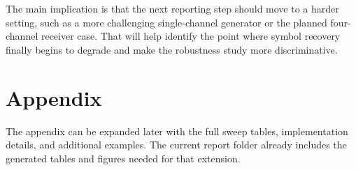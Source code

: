 \documentclass[conference]{IEEEtran}
\begin{document}
The main implication is that the next reporting step should move to a harder setting, such as a more challenging single-channel generator or the planned four-channel receiver case. That will help identify the point where symbol recovery finally begins to degrade and make the robustness study more discriminative.




\appendices
\section{Appendix}
The appendix can be expanded later with the full sweep tables, implementation details, and additional examples. The current report folder already includes the generated tables and figures needed for that extension.
\end{document}
